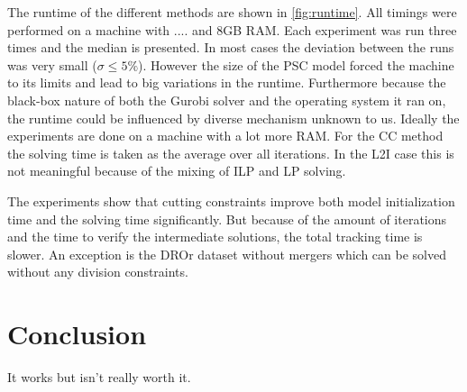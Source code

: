 \documentclass[10pt,twocolumn,letterpaper]{article}
\begin{document}
The runtime of the different methods are shown in \cref{fig:runtime}. All timings were performed on a machine with .... and 8GB RAM. Each experiment was run three times and the median is presented. In most cases the deviation between the runs was very small ($\sigma \leq 5\%$). However the size of the PSC model forced the machine to its limits and lead to big variations in the runtime. Furthermore because the black-box nature of both the Gurobi solver and the operating system it ran on, the runtime could be influenced by diverse mechanism unknown to us. Ideally the experiments are done on a machine with a lot more RAM. For the CC method the solving time is taken as the average over all iterations. In the L2I case this is not meaningful because of the mixing of ILP and LP solving.

The experiments show that cutting constraints improve both model initialization time and the solving time significantly. But because of the amount of iterations and the time to verify the intermediate solutions, the total tracking time is slower. An exception is the DROr dataset without mergers which can be solved without any division constraints.



\section{Conclusion}

It works but isn't really worth it.


{\small


}
\end{document}
